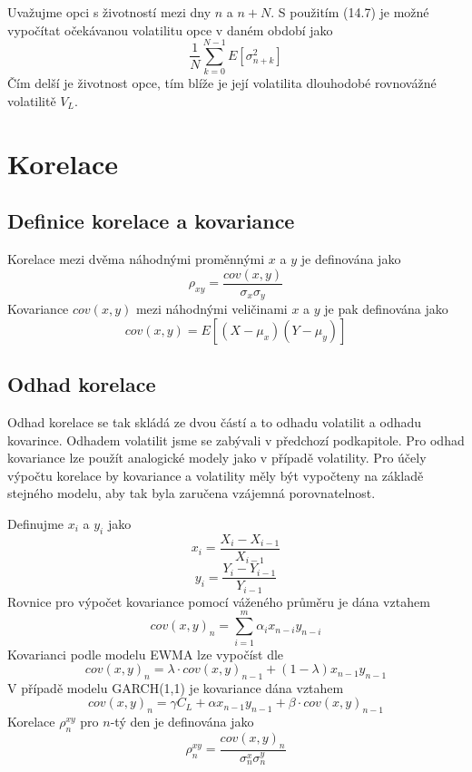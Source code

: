 \documentclass[a4paper]{book}
\begin{document}
Uvažujme opci s životností mezi dny $n$ a $n + N$. S použitím (14.7) je možné vypočítat očekávanou volatilitu opce v daném období jako
\begin{equation*}
\frac{1}{N}\sum_{k=0}^{N-1}E[\sigma_{n+k}^2]
\end{equation*}
Čím delší je životnost opce, tím blíže je její volatilita dlouhodobé rovnovážné volatilitě $V_L$.

\section{Korelace}

\subsection{Definice korelace a kovariance}

Korelace mezi dvěma náhodnými proměnnými $x$ a $y$ je definována jako
\begin{equation*}
\rho_{xy}=\frac{cov(x,y)}{\sigma_x \sigma_y}
\end{equation*}
Kovariance $cov(x,y)$ mezi náhodnými veličinami $x$ a $y$ je pak definována jako
\begin{equation*}
cov(x,y) = E[(X-\mu_x)(Y-\mu_y)]
\end{equation*}

\subsection{Odhad korelace}

Odhad korelace se tak skládá ze dvou částí a to odhadu volatilit a odhadu kovarince. Odhadem volatilit jsme se zabývali v předchozí podkapitole. Pro odhad kovariance lze použít analogické modely jako v případě volatility. Pro účely výpočtu korelace by kovariance a volatility měly být vypočteny na základě stejného modelu, aby tak byla zaručena vzájemná porovnatelnost.

Definujme $x_i$ a $y_i$ jako
\begin{equation*}
x_i = \frac{X_i - X_{i-1}}{X_{i-1}}
\end{equation*}
\begin{equation*}
y_i = \frac{Y_i - Y_{i-1}}{Y_{i-1}}
\end{equation*}
Rovnice pro výpočet kovariance pomocí váženého průměru je dána vztahem
\begin{equation*}
cov(x,y)_n = \sum_{i=1}^m \alpha_i x_{n-i} y_{n-i} 
\end{equation*}
Kovarianci podle modelu EWMA lze vypočíst dle
\begin{equation*}
cov(x,y)_n = \lambda \cdot cov(x,y)_{n-1} + (1-\lambda)x_{n-1}y_{n-1}
\end{equation*}
V případě modelu GARCH(1,1) je kovariance dána vztahem
\begin{equation*}
cov(x,y)_n = \gamma C_L + \alpha x_{n-1}y_{n-1}+\beta \cdot cov(x,y)_{n-1}
\end{equation*}
Korelace $\rho_n^{xy}$ pro $n$-tý den je definována jako
\begin{equation*}
\rho_n^{xy} = \frac{cov(x,y)_n}{\sigma_n^x \sigma_n^y}
\end{equation*}
\end{document}
